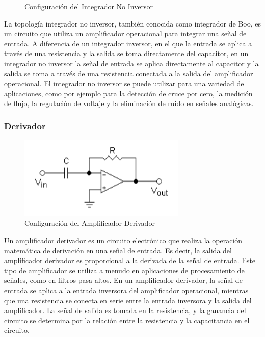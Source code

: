             \begin{figure}[H]
              \centering              
              \caption{Configuración del Integrador No Inversor}
              \label{fig:integrador_no_inversor0}
            \end{figure}

            La topología integrador no inversor, también conocida como integrador de Boo, es un circuito que utiliza un amplificador operacional para integrar una señal de entrada. A diferencia de un integrador inversor, en el que la entrada se aplica a través de una resistencia y la salida se toma directamente del capacitor, en un integrador no inversor la señal de entrada se aplica directamente al capacitor y la salida se toma a través de una resistencia conectada a la salida del amplificador operacional. El integrador no inversor se puede utilizar para una variedad de aplicaciones, como por ejemplo para la detección de cruce por cero, la medición de flujo, la regulación de voltaje y la eliminación de ruido en señales analógicas.

        \subsubsection{Derivador}

            \begin{figure}[H]
                \centering
                \includegraphics[width=8cm]{Imagenes/derivador.png}
                \caption{Configuración del Amplificador Derivador}
                \label{fig:derivador0}
            \end{figure}

            Un amplificador derivador es un circuito electrónico que realiza la operación matemática de derivación en una señal de entrada. Es decir, la salida del amplificador derivador es proporcional a la derivada de la señal de entrada. Este tipo de amplificador se utiliza a menudo en aplicaciones de procesamiento de señales, como en filtros pasa altos. En un amplificador derivador, la señal de entrada se aplica a la entrada inversora del amplificador operacional, mientras que una resistencia se conecta en serie entre la entrada inversora y la salida del amplificador. La señal de salida es tomada en la resistencia, y la ganancia del circuito se determina por la relación entre la resistencia y la capacitancia en el circuito. 
            
